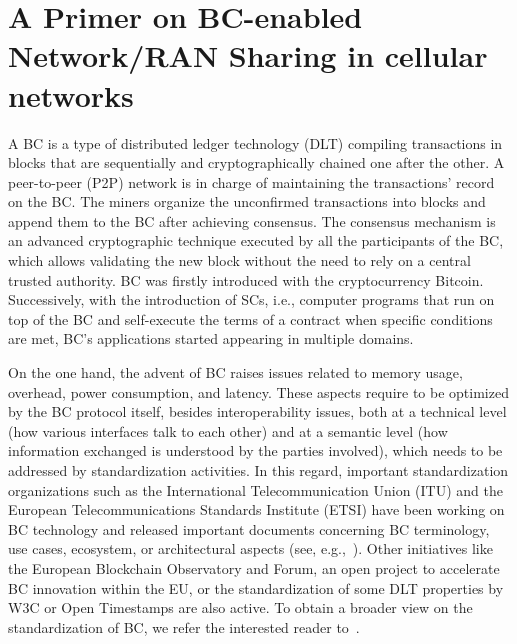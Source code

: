 \documentclass[journal]{IEEEtran}
\begin{document}
\section{A Primer on BC-enabled Network/RAN Sharing in cellular networks}
\label{section:related_work}

A BC is a type of distributed ledger technology (DLT) compiling transactions in blocks that are sequentially and cryptographically chained one after the other. A peer-to-peer (P2P)  network is in charge of maintaining the transactions' record on the BC. The miners organize the unconfirmed transactions into blocks and append them to the BC after achieving consensus. The consensus mechanism is an advanced cryptographic technique executed by all the participants of the BC, which allows validating the new block without the need to rely on a central trusted authority. BC was firstly introduced with the cryptocurrency Bitcoin. Successively, with the introduction of SCs, i.e., computer programs that run on top of the BC and self-execute the terms of a contract when specific conditions are met, BC's applications started appearing in multiple domains.%

On the one hand, the advent of BC raises issues related to memory usage, overhead, power consumption, and latency. These aspects require to be optimized by the BC protocol itself, besides interoperability issues, both at a technical level (how various interfaces talk to each other) and at a semantic level (how information exchanged is understood by the parties involved), which needs to be addressed by standardization activities. In this regard, important standardization organizations such as the International Telecommunication Union (ITU) and the European Telecommunications Standards Institute (ETSI) have been working on BC technology and released important documents concerning BC terminology, use cases, ecosystem, or architectural aspects (see, e.g.,~\cite{ITU1400,etsi2020permissioned}). Other initiatives like the European Blockchain Observatory and Forum, an open project to accelerate BC innovation within the EU, or the standardization of some DLT properties by W3C or Open Timestamps are also active. To obtain a broader view on the standardization of BC, we refer the interested reader to~\cite{konig2020comparing}.
\end{document}
